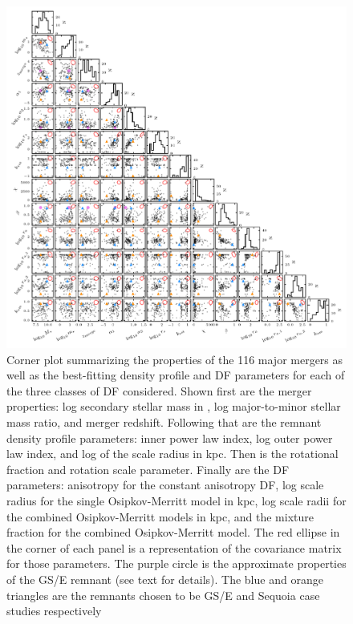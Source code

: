 \begin{figure}
    \centering
    \includegraphics[width=\textwidth]{figure/ch4/density_df_params.pdf}
    \caption{Corner plot summarizing the properties of the 116 major mergers as well as the best-fitting density profile and DF parameters for each of the three classes of DF considered. Shown first are the merger properties: log secondary stellar mass in \Msun, log major-to-minor stellar mass ratio, and merger redshift. Following that are the remnant density profile parameters: inner power law index, log outer power law index, and log of the scale radius in kpc. Then is the rotational fraction and rotation scale parameter. Finally are the DF parameters: anisotropy for the constant anisotropy DF, log scale radius for the single Osipkov-Merritt model in kpc, log scale radii for the combined Osipkov-Merritt models in kpc, and the mixture fraction for the combined Osipkov-Merritt model. The red ellipse in the corner of each panel is a representation of the covariance matrix for those parameters. The purple circle is the approximate properties of the GS/E remnant (see text for details). The blue and orange triangles are the remnants chosen to be GS/E and Sequoia case studies respectively}
    \label{ch4:fig:density-df-params}
\end{figure}

